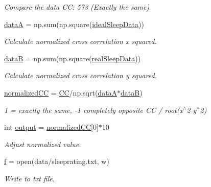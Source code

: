 \begin{DoxyCompactItemize}
\begin{DoxyCompactList}\small\item\em Compare the data CC\+: 573 (Exactly the same) \end{DoxyCompactList}\item 
\mbox{\hyperlink{namespacesleeprating_aab6cbcbccfa89f1cdeedee015ea70002}{dataA}} = np.\+sum(np.\+square(\mbox{\hyperlink{namespacesleeprating_a9e349b9812b2428e147dc1612fa5126d}{ideal\+Sleep\+Data}}))
\begin{DoxyCompactList}\small\item\em Calculate normalized cross correlation x squared. \end{DoxyCompactList}\item 
\mbox{\hyperlink{namespacesleeprating_ab660d30857a5b0d3afabc6a91d7b24e2}{dataB}} = np.\+sum(np.\+square(\mbox{\hyperlink{namespacesleeprating_a69adab626860ce563388eca964e80eb0}{real\+Sleep\+Data}}))
\begin{DoxyCompactList}\small\item\em Calculate normalized cross correlation y squared. \end{DoxyCompactList}\item 
\mbox{\hyperlink{namespacesleeprating_ab32193f6862474b22eb3867a4705ed42}{normalized\+CC}} = \mbox{\hyperlink{namespacesleeprating_abe9d10de2c37eaa74afd164d3121680c}{CC}}/np.\+sqrt(\mbox{\hyperlink{namespacesleeprating_aab6cbcbccfa89f1cdeedee015ea70002}{dataA}}$\ast$\mbox{\hyperlink{namespacesleeprating_ab660d30857a5b0d3afabc6a91d7b24e2}{dataB}})
\begin{DoxyCompactList}\small\item\em 1 = exactly the same, -\/1 completely opposite CC / root(x$^\wedge$2 y$^\wedge$2) \end{DoxyCompactList}\item 
int \mbox{\hyperlink{namespacesleeprating_a11e97cac9b74432fdff92d0cb7e069ef}{output}} = \mbox{\hyperlink{namespacesleeprating_ab32193f6862474b22eb3867a4705ed42}{normalized\+CC}}\mbox{[}0\mbox{]}$\ast$10
\begin{DoxyCompactList}\small\item\em Adjust normalized value. \end{DoxyCompactList}\item 
\mbox{\hyperlink{namespacesleeprating_add5fbadc2a13bb8abfecdd2f4523ffe4}{f}} = open(\textquotesingle{}data/sleeprating.\+txt\textquotesingle{}, \textquotesingle{}w\textquotesingle{})
\begin{DoxyCompactList}\small\item\em Write to txt file. \end{DoxyCompactList}\end{DoxyCompactItemize}



